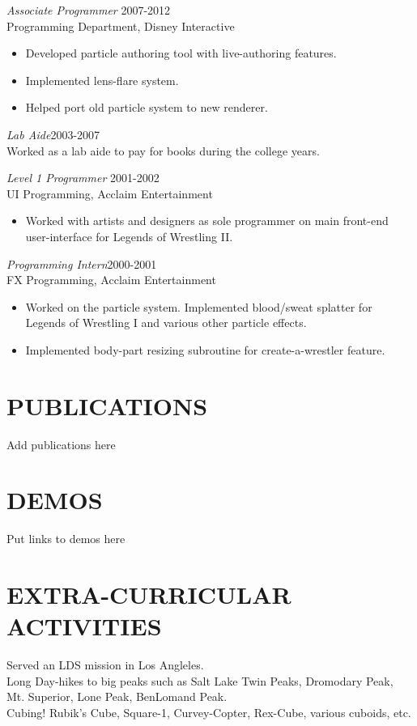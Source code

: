\documentclass[margin]{res}
\begin{document}
\begin{resume}
                {\sl Associate Programmer} \hfill 2007-2012 \\
		Programming Department, Disney Interactive
                 \begin{itemize}  \itemsep -2pt %
		\item Developed particle authoring tool with live-authoring features.
		\item Implemented lens-flare system.
		\item Helped port old particle system to new renderer.
                 \end{itemize} 

		{\sl Lab Aide}\hfill 2003-2007 \\
		Worked as a lab aide to pay for books during the college years.

                {\sl Level 1 Programmer} \hfill 2001-2002 \\
		UI Programming, Acclaim Entertainment
                  \begin{itemize}\itemsep -2pt %
                   \item Worked with artists and designers as sole programmer on main front-end user-interface for Legends of Wrestling II.
                   \end{itemize} 

		{\sl Programming Intern}\hfill 2000-2001 \\
		FX Programming, Acclaim Entertainment
		\begin{itemize}\itemsep -2pt %
		\item Worked on the particle system.  Implemented blood/sweat splatter for Legends of Wrestling I and various other particle effects.
		\item Implemented body-part resizing subroutine for create-a-wrestler feature.
		\end{itemize}

\section{PUBLICATIONS}
		Add publications here \\

\section{DEMOS}
		Put links to demos here \\

\section{EXTRA-CURRICULAR \\ ACTIVITIES}
		Served an LDS mission in Los Angleles. \\
		Long Day-hikes to big peaks such as Salt Lake Twin Peaks, Dromodary Peak, Mt. Superior, Lone Peak, BenLomand Peak. \\
		Cubing!  Rubik's Cube, Square-1, Curvey-Copter, Rex-Cube, various cuboids, etc.

\end{resume}
\end{document}

